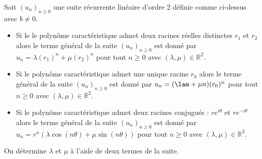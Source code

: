 \documentclass[a4paper,10pt]{report}
\begin{document}
\begin{thm}
Soit $(u_n)_{n \geq 0}$ une suite récurrente linéaire d'ordre 2 définie comme ci-dessus avec $b \neq 0.$
\begin{itemize}
\item Si le le polynôme caractéristique admet deux racines réelles distinctes $r_1$ et $r_2$ alors le terme général de la suite $(u_n)_{n \geq 0}$ est donné par $u_n=\lambda (r_1)^n+\mu (r_2)^n$ pour tout $n \geq 0$ avec $(\lambda,\mu) \in \mathbb{R}^2$.
\item Si le polynôme caractéristique admet une unique racine $r_0$ alors le terme général de la suite $(u_n)_{n \geq 0}$ est donné par $u_n= (\lam+\mu n)(r_0)^n$ pour tout $n \geq 0$ avec $(\lambda,\mu) \in \mathbb{R}^2$.
\item Si le polynôme caractéristique admet deux racines conjugués : $r e^{i \theta}$ et $r e^{- i \theta}$ alors le terme général de la suite $(u_n)_{n \geq 0}$ est donné par $u_n=r^n (\lambda \cos(n \theta)+ \mu \sin(n \theta))$ pour tout $n \geq 0$ avec $(\lambda,\mu) \in \mathbb{R}^2$.
\end{itemize}
\end{thm}

\begin{rem} On détermine $\lambda$ et $\mu$ à l'aide de deux termes de la suite.
\end{rem}
\end{document}
